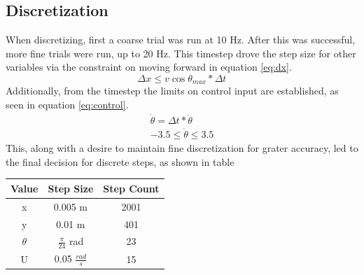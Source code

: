 \subsection{Discretization}
When discretizing, first a coarse trial was run at 10 Hz. After this was successful, more fine trials were run, up to 20 Hz. This timestep drove the step size for other variables via the constraint on moving forward in equation \ref{eq:dx}.
\begin{equation}
    \Delta x \leq v \cos \theta _{max} * \Delta t
    \label{eq:dx}
\end{equation}
Additionally, from the timestep the limits on control input are established, as seen in equation \ref{eq:control}.
\begin{equation}
\begin{split}
    \dot \theta = \Delta t * \ddot \theta\\
    -3.5 \leq \dot \theta\leq 3.5
\end{split}\label{eq:control}
\end{equation}
This, along with a desire to maintain fine discretization for grater accuracy, led to the final decision for discrete steps, as shown in table
\begin{center}
 \begin{tabular}{||c c c||} 
 \hline
 Value & Step Size & Step Count \\ [0.5ex] 
 \hline\hline
 x & 0.005 m & 2001 \\ 
 \hline
 y & 0.01 m & 401 \\
 \hline
 $\theta$ & $\frac{\pi}{24}$ rad & 23 \\
 \hline
 U & 0.05 $\frac{rad}{s}$ & 15\\
 \hline
\end{tabular}
\end{center}

